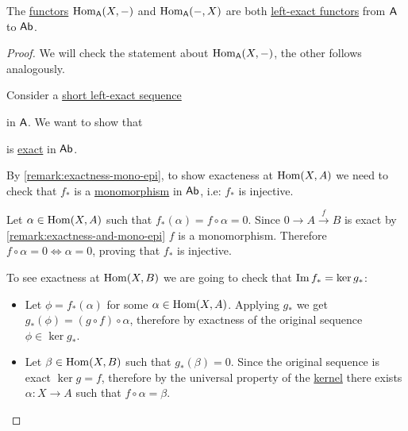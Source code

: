 \documentclass[../../../main]{subfiles}
\begin{document}
\begin{example} \label{ex:hom-left-exact}
  The \hyperref[def:functor]{functors} \(\operatorname{Hom}_{\mathsf{A}}(X, -)\) and \(\operatorname{Hom}_{\mathsf{A}}(-, X)\) are both \hyperref[def:exact-functor]{left-exact functors} from \(\mathsf{A}\) to \(\mathsf{Ab}\).
\end{example}
\begin{proof}
  We will check the statement about \(\operatorname{Hom}_{\mathsf{A}}(X, -)\), the other follows analogously.

  Consider a \hyperref[def:short-exact-sequence]{short left-exact sequence}
  \begin{center}
  \end{center}
  in \(\mathsf{A}\). We want to show that
  \begin{center}
  \end{center}
  is \hyperref[def:short-exact-sequence]{exact} in \(\mathsf{Ab}\).

  By \autoref{remark:exactness-mono-epi}, to show exacteness at \(\operatorname{Hom}(X, A)\) we need to check that \(f_{\ast}\) is a \hyperref[def:mono-epi-morphism]{monomorphism} in \(\mathsf{Ab}\), i.e: \(f_{\ast}\) is injective.

  Let \(\alpha \in \operatorname{Hom}(X, A)\) such that \(f_{\ast}(\alpha) = f \circ \alpha = 0\).
  Since \(0 \to A \xrightarrow{f} B\) is exact by \autoref{remark:exactness-and-mono-epi} \(f\) is a monomorphism.
  Therefore \(f \circ \alpha = 0 \iff \alpha = 0\), proving that \(f_{\ast}\) is injective.

  To see exactness at \(\operatorname{Hom}(X, B)\) we are going to check that \(\operatorname*{Im} f_{\ast} = \ker g_{\ast}\):
  \begin{itemize}
    \item[\(\subseteq\)] Let \(\phi = f_{\ast}(\alpha)\) for some \(\alpha \in \operatorname{Hom}(X, A)\).
          Applying \(g_{\ast}\) we get \(g_{\ast}(\phi) = (g \circ f) \circ \alpha\), therefore by exactness of the original sequence \(\phi \in \ker g_{\ast}\).
    \item[\(\supseteq\)] Let \(\beta \in \operatorname{Hom}(X, B)\) such that \(g_{\ast}(\beta) = 0\).
          Since the original sequence is exact \(\ker g = f\), therefore by the universal property of the \hyperref[def:categorical-kernel]{kernel} there exists \(\alpha: X \to A\) such that \(f \circ \alpha = \beta\).
  \end{itemize}
\end{proof}
\end{document}

